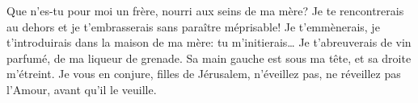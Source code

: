 Que n’es-tu pour moi un frère, nourri aux seins de ma mère?
	Je te rencontrerais au dehors et je t’embrasserais sans paraître méprisable!
Je t’emmènerais, je t’introduirais dans la maison de ma mère:
	tu m’initierais… Je t’abreuverais de vin parfumé, de ma liqueur de grenade.
Sa main gauche est sous ma tête, et sa droite m’étreint.
Je vous en conjure, filles de Jérusalem,
	n’éveillez pas, ne réveillez pas l’Amour, avant qu’il le veuille.
